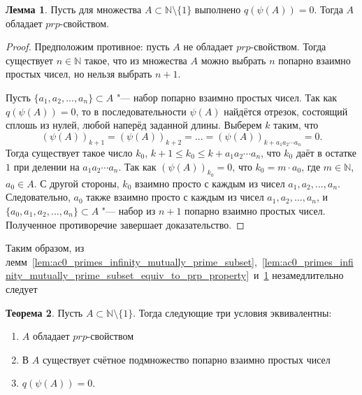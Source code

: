 \documentclass[a4paper,openbib]{article}
\renewcommand{\leq}{\leqslant}
\theoremstyle{definition}
\newtheorem{lemma}{Лемма}[section]
\newtheorem{theorem}[lemma]{Теорема}
\begin{document}

\begin{lemma}
	\label{lem:ac0_primes_q_psi_A_0_causes_prp}
	Пусть для множества $A\subset\mathbb{N}\setminus\{1\}$ выполнено $q(\psi(A))=0$.
	Тогда $A$ обладает $prp$-свойством.
\end{lemma}

\begin{proof}
	Предположим противное: пусть $A$ не обладает $prp$-свойством.
	Тогда существует $n\in\mathbb{N}$ такое, что из множества $A$ можно выбрать $n$
	попарно взаимно простых чисел, но нельзя выбрать $n+1$.
	
	Пусть $\{a_1, a_2, ..., a_n\}\subset A$ "--- набор попарно взаимно простых чисел.
	Так как $q(\psi(A))=0$, то в последовательности $\psi(A)$ найдётся отрезок, состоящий сплошь из нулей,
	любой наперёд заданной длины.
	Выберем $k$ таким, что
	\begin{equation}
		(\psi(A))_{k+1} = (\psi(A))_{k+2} = ... = (\psi(A))_{k+a_1a_2\cdots a_n} = 0
		.
	\end{equation}
	Тогда существует такое число $k_0$, $k+1 \leq k_0 \leq k+a_1a_2\cdots a_n$,
	что $k_0$ даёт в остатке $1$ при делении на $a_1a_2\cdots a_n$.
	Так как $(\psi(A))_{k_0} = 0$, что $k_0 = m\cdot a_0$, где $m\in\mathbb{N}$, $a_0\in A$.
	С другой стороны, $k_0$ взаимно просто с каждым из чисел $a_1, a_2, ..., a_n$.
	Следовательно, $a_0$ также взаимно просто с каждым из чисел $a_1, a_2, ..., a_n$,
	и $\{a_0, a_1, a_2, ..., a_n\}\subset A$ "--- набор из $n+1$ попарно взаимно простых чисел.
	Полученное противоречие завершает доказательство.
\end{proof}

Таким образом,
из лемм~\ref{lem:ac0_primes_infinity_mutually_prime_subset},~\ref{lem:ac0_primes_infinity_mutually_prime_subset_equiv_to_prp_property}~и~\ref{lem:ac0_primes_q_psi_A_0_causes_prp}
незамедлительно следует
\begin{theorem}
	Пусть $A\subset \mathbb{N}\setminus\{1\}$.
	Тогда следующие три условия эквивалентны:
	\begin{enumerate}
		\item
			$A$ обладает $prp$-свойством
		\item
			В $A$ существует счётное подмножество попарно взаимно простых чисел
		\item
			$q(\psi(A))=0$.
	\end{enumerate}
\end{theorem}
\end{document}
